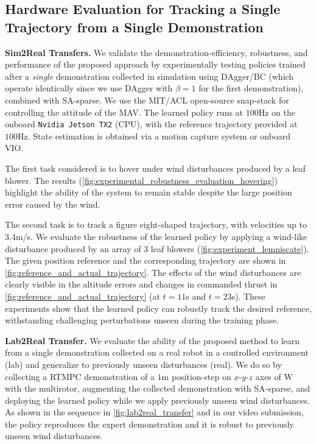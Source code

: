 \subsection{Hardware Evaluation for Tracking a Single Trajectory from a Single Demonstration}
\noindent \textbf{Sim2Real Transfers.}
We validate the demonstration-efficiency, robustness, and performance of the proposed approach by experimentally testing policies trained after a \textit{single} demonstration collected in simulation using DAgger/BC (which operate identically since we use DAgger with $\beta=1$ for the first demonstration), combined with \ac{SA}-sparse. We use the MIT/ACL open-source snap-stack \cite{acl_snap_stack} for controlling the attitude of the MAV. The learned policy runs at $100$Hz on the onboard \texttt{Nvidia Jetson TX2} (CPU), with the reference trajectory provided at $100$Hz. State estimation is obtained via a motion capture system or onboard \ac{VIO}. 

The first task considered is to hover under wind disturbances produced by a leaf blower. The results (\cref{fig:experimental_robustness_evaluation_hovering}) highlight the ability of the system to remain stable despite the large position error caused by the wind. 

The second task is to track a figure eight-shaped trajectory, with velocities up to $3.4$m/s. We evaluate the robustness of the learned policy by applying a wind-like disturbance produced by an array of $3$ leaf blowers (\cref{fig:experiment_lemniscate}). The given position reference and the corresponding trajectory are shown in \cref{fig:reference_and_actual_trajectory}. The effects of the wind disturbances are clearly visible in the altitude errors and changes in commanded thrust in \cref{fig:reference_and_actual_trajectory} (at $t=11$s and $t=23$s). 
These experiments show that the learned policy can robustly track the desired reference, withstanding challenging perturbations unseen during the training phase. 

\noindent \textbf{Lab2Real Transfer.} We evaluate the ability of the proposed method to learn from a single demonstration collected on a real robot in a controlled environment (lab) and generalize to previously unseen disturbances (real). We do so by collecting a \ac{RTMPC} demonstration of a $1$m position-step on $x$-$y$-$z$ axes of $\text{W}$ with the multirotor, augmenting the collected demonstration with \ac{SA}-sparse, and deploying the learned policy while we apply previously unseen wind disturbances. As shown in the sequence in \cref{fig:lab2real_transfer} and in our video submission, the policy reproduces the expert demonstration and it is robust to previously unseen wind disturbances.

